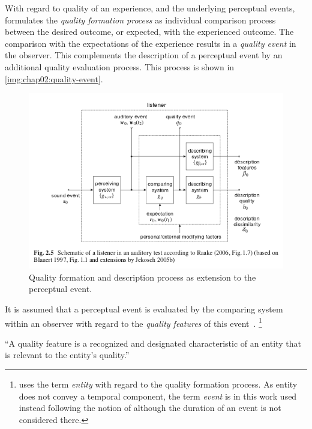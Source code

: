 With regard to quality of an experience, and the underlying perceptual events, \cite{jekosch_voice_2005} formulates the \emph{quality formation process} as individual comparison process between the desired outcome, or expected, with the experienced outcome.
The comparison with the expectations of the experience results in a \emph{quality event} in the observer.
This complements the description of a perceptual event by an additional quality evaluation process.
This process is shown in \autoref{img:chap02:quality-event}.
\begin{figure}
	\includegraphics[width=1\textwidth]{figure/quality-event}
	\caption{Quality formation and description process as extension to the perceptual event.}
	\label{img:chap02:quality-event}
\end{figure}

It is assumed that a perceptual event is evaluated by the comparing system within an observer with regard to the \emph{quality features} of this event~\citet[\cf p. 17]{jekosch_voice_2005}.
\footnote{\citet{jekosch_voice_2005} uses the term \emph{entity} with regard to the quality formation process.
As entity does not convey a temporal component, the term \emph{event} is in this work used instead following the notion of \cite{blauert_spatial_1996} although the duration of an event is not considered there.}

\begin{definition}
``A quality feature is a recognized and designated characteristic of an entity that is relevant to the entity's quality.''~\citep[p. 17]{jekosch_voice_2005}
\end{definition}

